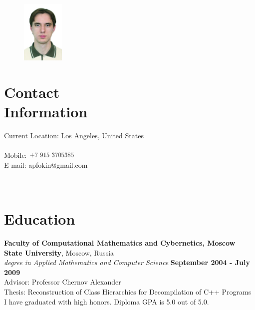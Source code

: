\documentclass[margin,line]{CV}
\begin{document}
\begin{resume}

\begin{figure}
    \vspace{-20pt}
    \includegraphics[width=2cm]{photo.jpg}
    \vspace{-20pt}
\end{figure}

    \section{\mysidestyle Contact\\Information}
    Current Location: Los Angeles, United States \\
    \\
    Mobile: \includegraphics[height=0.35cm]{phone.png} \\ 
    E-mail: apfokin@gmail.com \\
    \\
    \\


    \section{\mysidestyle Education}
    \textbf{Faculty of Computational Mathematics and Cybernetics, Moscow State University}, Moscow, Russia \vspace{2mm}\\\vspace{1mm}%
    \textsl{ degree in Applied Mathematics and Computer Science} \hfill \textbf{September 2004 - July 2009}\vspace{1mm}\\
    Advisor: Professor Chernov Alexander \\
    Thesis: Reconstruction of Class Hierarchies for Decompilation of C++ Programs \\
    I have graduated with high honors. Diploma GPA is 5.0 out of 5.0.


\end{resume}
\end{document}
